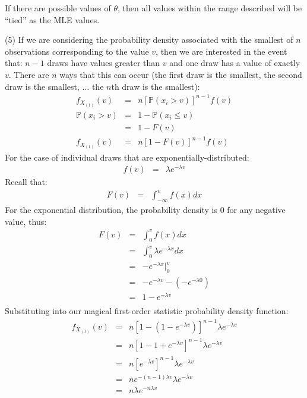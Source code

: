 \documentclass[11pt]{article}
\renewcommand{\Pr}{{\mathbb P}}
\begin{document}
If there are possible values of $\theta$, then all values within the range described will be ``tied'' as the MLE values.

\newpage
(5) If we are considering the probability density associated with the smallest of $n$ observations corresponding to the value $v$, then we are interested in the event that:
 $n-1$ draws have values greater than $v$ and one draw has a value of exactly $v$.
There are $n$ ways that this can occur (the first draw is the smallest, the second draw is the smallest, $\ldots$ the $n$th draw is the smallest):
\begin{eqnarray*}
	f_{X_{(1)}}(v) & = & n\left[\Pr(x_i > v)\right]^{n-1}f(v)\\
	\Pr(x_i > v) & = & 1 - \Pr(x_i \leq v) \\
		& = & 1 - F(v) \\
	f_{X_{(1)}}(v) & = & n\left[1-  F(v)\right]^{n-1}f(v)
\end{eqnarray*}
For the case of individual draws that are exponentially-distributed:
\begin{eqnarray*}
	f(v) & = & \lambda e ^{-\lambda v}
\end{eqnarray*}
Recall that:
\begin{eqnarray*}
	F(v) & = & \int_{-\infty}^v f(x) dx
\end{eqnarray*}
For the exponential distribution, the probability density is 0 for any negative value, thus:
\begin{eqnarray*}
	F(v) & = & \int_{0}^v f(x) dx \\
		& = & \int_{0}^v \lambda e ^{-\lambda x} dx \\
		& = & -e ^{-\lambda x}\Big|_0^v \\
		& = & -e ^{-\lambda v} - \left(-e ^{-\lambda 0}\right) \\
		& = & 1 -  e ^{-\lambda v}\\
\end{eqnarray*}
Substituting into our magical first-order statistic probability density function:
\begin{eqnarray*}
	f_{X_{(1)}}(v) & = & n\left[1-  (1 -  e ^{-\lambda v})\right]^{n-1}\lambda e ^{-\lambda v} \\
	   & = & n\left[1-  1 +  e ^{-\lambda v}\right]^{n-1}\lambda e ^{-\lambda v} \\
	   & = & n\left[e ^{-\lambda v}\right]^{n-1}\lambda e ^{-\lambda v} \\
	   & = & n e ^{-(n-1)\lambda v}\lambda e ^{-\lambda v} \\
	   & = & n \lambda e ^{-n\lambda v} \\
\end{eqnarray*}
\end{document}
